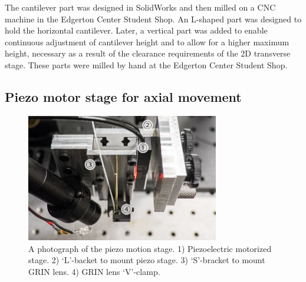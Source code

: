 
The cantilever part was designed in SolidWorks and then milled on a CNC machine in the Edgerton Center Student Shop. An L-shaped part was designed to hold the horizontal cantilever. Later, a vertical part was added to enable continuous adjustment of cantilever height and to allow for a higher maximum height, necessary as a result of the clearance requirements of the 2D transverse stage. These parts were milled by hand at the Edgerton Center Student Shop.

\subsection{Piezo motor stage for axial movement}



\begin{figure}[h!]
\centering
\includegraphics[width=0.75\textwidth]{Images/Photographs/DSCF1714_an.jpg}
\caption[Photograph of the piezo motion stage.]{A photograph of the piezo motion stage. 1) Piezoelectric motorized stage. 2) `L'-backet to mount piezo stage. 3) `S'-bracket to mount GRIN lens. 4) GRIN lens `V'-clamp.}
\end{figure}

